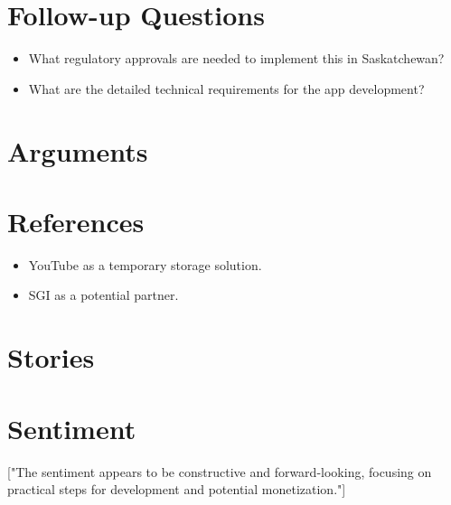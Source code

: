 \documentclass{article}
\begin{document}
\section{Follow-up Questions}
\begin{itemize}[leftmargin=*]
  \item What regulatory approvals are needed to implement this in Saskatchewan?
  \item What are the detailed technical requirements for the app development?
\end{itemize}

\section{Arguments}
\begin{itemize}[leftmargin=*]
\end{itemize}

\section{References}
\begin{itemize}[leftmargin=*]
  \item YouTube as a temporary storage solution.
  \item SGI as a potential partner.
\end{itemize}

\section{Stories}
\begin{itemize}[leftmargin=*]
\end{itemize}

\section{Sentiment}
["The sentiment appears to be constructive and forward-looking, focusing on practical steps for development and potential monetization."]
\end{document}
